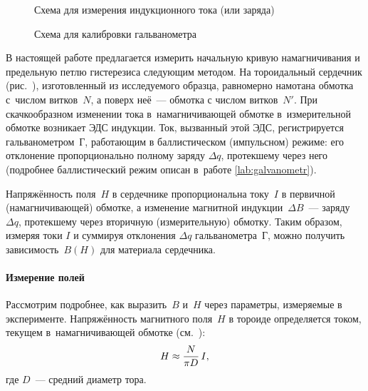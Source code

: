 
\begin{figure}[h!]
	\begin{minipage}[b]{0.55\textwidth}
		\caption{Схема для измерения индукционного тока (или заряда)}
	\end{minipage}%
\hfill
	\begin{minipage}[b]{0.4\textwidth}
        \centering
		\caption{Схема для калибровки гальванометра}
	\end{minipage}
\end{figure}

В настоящей работе предлагается измерить начальную кривую намагничивания
и предельную петлю гистерезиса следующим методом.
На тороидальный сердечник (рис.~), изготовленный из исследуемого образца,
равномерно намотана  обмотка 
с~числом витков~$N$, а поверх неё~---  
обмотка с числом витков~$N'$.
При скачкообразном изменении тока в~намагничивающей обмотке
в~измерительной обмотке возникает ЭДС индукции. Ток, вызванный
этой ЭДС, регистрируется гальванометром~Г, работающим в баллистическом
(импульсном) режиме: его отклонение пропорционально полному
заряду $\Delta q$, протекшему через него (подробнее баллистический режим
описан в~работе \ref{lab:galvanometr}).

Напряжённость поля~$H$ в сердечнике пропорциональна току~$I$ в первичной
(намагничивающей) обмотке, а изменение магнитной индукции~$\Delta B$~---
заряду $\Delta q$, протекшему через вторичную (измерительную) обмотку. 
Таким образом, измеряя токи $I$ и суммируя отклонения $\Delta q$ гальванометра~Г, 
можно получить зависимость~$B(H)$ для материала сердечника.

\paragraph{Измерение полей}
Рассмотрим подробнее, как выразить~$B$ и~$H$ через параметры, измеряемые в
эксперименте. Напряжённость магнитного поля~$H$ в тороиде определяется током,
текущем в~намагничивающей обмотке (см.~):
\begin{equation}
	\eqmark{2}
	H\approx\frac{N}{\pi D}\,I,
\end{equation}
где $D$~--- средний диаметр тора.

